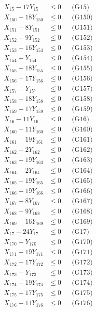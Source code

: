 \documentclass[a4paper,10pt]{article}
\begin{document}
{\begin{align}
X_{15} - 17Y_{15} &\leq 0 && \text{(G15)} \\
X_{150} - 18Y_{150} &\leq 0 && \text{(G150)} \\
X_{151} - 8Y_{151} &\leq 0 && \text{(G151)} \\
\allowbreak
X_{152} - 9Y_{152} &\leq 0 && \text{(G152)} \\
X_{153} - 16Y_{153} &\leq 0 && \text{(G153)} \\
X_{154} - Y_{154} &\leq 0 && \text{(G154)} \\
X_{155} - 18Y_{155} &\leq 0 && \text{(G155)} \\
X_{156} - 17Y_{156} &\leq 0 && \text{(G156)} \\
X_{157} - Y_{157} &\leq 0 && \text{(G157)} \\
X_{158} - 18Y_{158} &\leq 0 && \text{(G158)} \\
X_{159} - 17Y_{159} &\leq 0 && \text{(G159)} \\
X_{16} - 11Y_{16} &\leq 0 && \text{(G16)} \\
X_{160} - 11Y_{160} &\leq 0 && \text{(G160)} \\
X_{161} - 19Y_{161} &\leq 0 && \text{(G161)} \\
X_{162} - 2Y_{162} &\leq 0 && \text{(G162)} \\
X_{163} - 19Y_{163} &\leq 0 && \text{(G163)} \\
X_{164} - 2Y_{164} &\leq 0 && \text{(G164)} \\
X_{165} - 19Y_{165} &\leq 0 && \text{(G165)} \\
X_{166} - 19Y_{166} &\leq 0 && \text{(G166)} \\
X_{167} - 8Y_{167} &\leq 0 && \text{(G167)} \\
X_{168} - 9Y_{168} &\leq 0 && \text{(G168)} \\
X_{169} - 16Y_{169} &\leq 0 && \text{(G169)} \\
X_{17} - 24Y_{17} &\leq 0 && \text{(G17)} \\
\allowbreak
X_{170} - Y_{170} &\leq 0 && \text{(G170)} \\
X_{171} - 19Y_{171} &\leq 0 && \text{(G171)} \\
X_{172} - 17Y_{172} &\leq 0 && \text{(G172)} \\
X_{173} - Y_{173} &\leq 0 && \text{(G173)} \\
X_{174} - 19Y_{174} &\leq 0 && \text{(G174)} \\
X_{175} - 17Y_{175} &\leq 0 && \text{(G175)} \\
X_{176} - 11Y_{176} &\leq 0 && \text{(G176)} \\

\end{align}}
\end{document}
